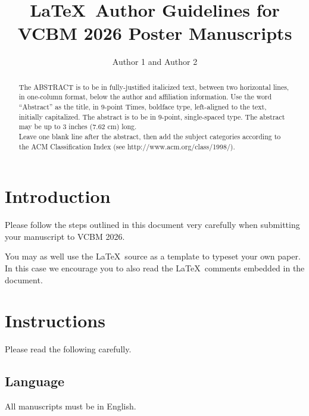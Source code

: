 \documentclass{egpubl-eurovis-short}
\title[VCBM 2026 \LaTeX\ Author Guidelines]%
      {\LaTeX\ Author Guidelines for VCBM 2026 Poster Manuscripts}
\author[Author 1 et al.]{Author 1 and Author 2}
\begin{document}

\maketitle

\begin{abstract}
   The ABSTRACT is to be in fully-justified italicized text, 
   between two horizontal lines,
   in one-column format, 
   below the author and affiliation information. 
   Use the word ``Abstract'' as the title, in 9-point Times, boldface type, 
   left-aligned to the text, initially capitalized. 
   The abstract is to be in 9-point, single-spaced type.
   The abstract may be up to 3 inches (7.62 cm) long. \\
   Leave one blank line after the abstract, 
   then add the subject categories according to the ACM Classification Index 
   (see http://www.acm.org/class/1998/).

\end{abstract}

\section{Introduction}

Please follow the steps outlined in this document very carefully when
submitting your manuscript to VCBM 2026.

You may as well use the \LaTeX\ source as a template to typeset your own
paper. In this case we encourage you to also read the \LaTeX\ comments
embedded in the document.

\section{Instructions}

Please read the following carefully.

\subsection{Language}

All manuscripts must be in English.
\end{document}

